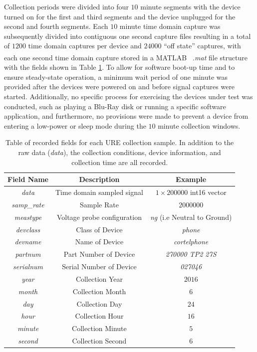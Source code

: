 Collection periods were divided into four $10$ minute segments with the device turned on for the first and third segments and the device unplugged for the second and fourth segments.  Each $10$ minute time domain capture was subsequently divided into contiguous one second capture files resulting in a total of $1200$ time domain captures per device and  $24000$ ``off state'' captures, with each one second time domain capture stored in a MATLAB\textsuperscript \textregistered ~ \textit{.mat} file structure with the fields shown in Table \ref{tab:collection_parameters}.  To allow for software boot-up time and to ensure steady-state operation, a minimum wait period of one minute was provided after the devices were powered on and before signal captures were started.  Additionally, no specific process for exercising the devices under test was conducted, such as playing a Blu-Ray disk or running a specific software application, and furthermore, no provisions were made to prevent a device from entering a low-power or sleep mode during the $10$ minute collection windows.

\begin{table}[tb]
	\caption{Table of recorded fields for each URE collection sample.  In addition to the raw data (\textit{data}), the collection conditions, device information, and collection time are all recorded.}
	\centering
		\begin{tabular}{c|c|c}
		\hline
		Field Name & Description & Example \\
		\hline
    \textit{data} & Time domain sampled signal & $1 \times 200000$ int16 vector \\
		\textit{samp\_rate} & Sample Rate & $2000000$ \\
		\textit{meastype} & Voltage probe configuration & \textit{ng} (i.e Neutral to Ground) \\
		\textit{devclass} & Class of Device & \textit{phone} \\
		\textit{devname} & Name of Device & \textit{cortelphone} \\
		\textit{partnum} & Part Number of Device & \textit{270000 TP2 27S} \\
		\textit{serialnum} & Serial Number of Device & \textit{027046} \\
		\textit{year} & Collection Year & $2016$ \\
		\textit{month} & Collection Month & $6$ \\
		\textit{day} & Collection Day & $24$ \\
		\textit{hour} & Collection Hour & $16$ \\
		\textit{minute} & Collection Minute & $5$ \\
		\textit{second} & Collection Second & $6$ \\
    \hline
		\end{tabular}
	\label{tab:collection_parameters}
\end{table}